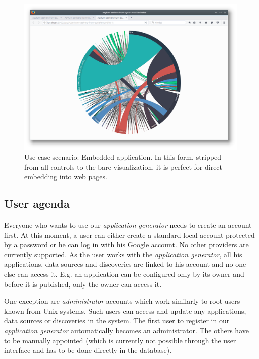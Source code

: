 \begin{figure}
	\centering
	\includegraphics[width=145mm]{img/05_scenario_11_embedded_application}
	\caption{Use case scenario: Embedded application. In this form, stripped from all controls to the bare visualization, it is perfect for direct embedding into web pages.}
    \label{fig:scenario-11-embedded-application}
\end{figure}


\subsection{User agenda}

Everyone who wants to use our \emph{application generator} needs to create an account first. At this moment, a user can either create a standard local account protected by a password or he can log in with his Google account. No other providers are currently supported. As the user works with the \emph{application generator}, all his applications, data sources and discoveries are linked to his account and no one else can access it. E.g. an application can be configured only by its owner and before it is published, only the owner can access it.

One exception are \emph{administrator} accounts which work similarly to root users known from Unix systems. Such users can access and update any applications, data sources or discoveries in the system. The first user to register in our \emph{application generator} automatically becomes an administrator.  The others have to be manually appointed (which is currently not possible through the user interface and has to be done directly in the database).

